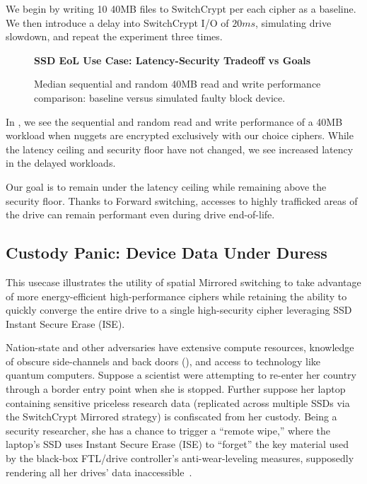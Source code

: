 We begin by writing 10 40MB files to SwitchCrypt per each cipher as a baseline.
We then introduce a delay into SwitchCrypt I/O of $20ms$, simulating drive
slowdown, and repeat the experiment three times.

\begin{figure}[ht] \textbf{SSD EoL Use Case: Latency-Security Tradeoff vs
   Goals}\par\medskip {} \caption{Median
   sequential and random 40MB read and write performance comparison: baseline
   versus simulated faulty block device.}
  \label{fig:usecase-eol-tradeoff}
\end{figure}

In , we see the sequential and random read and
write performance of a 40MB workload when nuggets are encrypted exclusively with
our choice ciphers. While the latency ceiling and security floor have not
changed, we see increased latency in the delayed workloads.

Our goal is to remain under the latency ceiling while remaining above the
security floor. Thanks to Forward switching, accesses to highly trafficked areas
of the drive can remain performant even during drive end-of-life.

\subsection{Custody Panic: Device Data Under Duress} \label{subsec:uc4}

This usecase illustrates the utility of spatial Mirrored switching to take
advantage of more energy-efficient high-performance ciphers while retaining the
ability to quickly converge the entire drive to a single high-security cipher
leveraging SSD Instant Secure Erase (ISE).

Nation-state and other adversaries have extensive compute resources, knowledge
of obscure side-channels and back doors (),
and access to technology like quantum computers. Suppose a scientist were
attempting to re-enter her country through a border entry point when she is
stopped. Further suppose her laptop containing sensitive priceless research data
(replicated across multiple SSDs via the SwitchCrypt Mirrored strategy) is
confiscated from her custody. Being a security researcher, she has a chance to
trigger a ``remote wipe,'' where the laptop's SSD uses Instant Secure Erase
(ISE) to ``forget'' the key material used by the black-box FTL/drive
controller's anti-wear-leveling measures, supposedly rendering all her drives'
data inaccessible~\cite{ISE1,ISE2,ISE3}.


